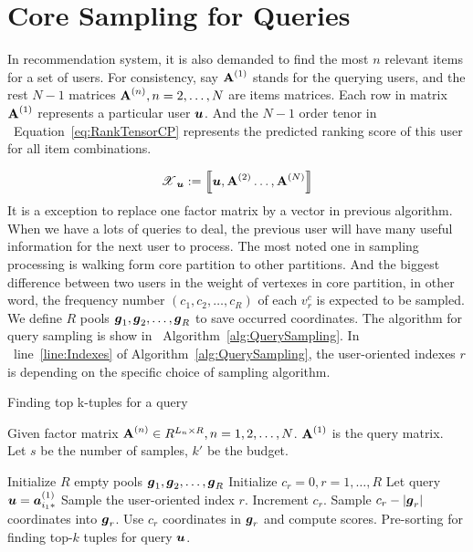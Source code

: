 \documentclass[letterpaper]{article}
\newcommand{\T}[1]{\boldsymbol{\mathscr{\MakeUppercase{#1}}}}
\newcommand{\KT}[1]{\left\llbracket #1 \right\rrbracket}
\newcommand{\V}[1]{{\bm{{\MakeLowercase{#1}}}}}
\newcommand{\VnC}[3]{\V{#1}^{(#2)}_{#3}}
\newcommand{\M}[1]{{\bm{\mathbf{\MakeUppercase{#1}}}}}
\newcommand{\Mn}[2]{\M{#1}^{(#2)}}
\newcommand{\Eqn}[1]   {Equation~\ref{eq:#1}}
\newcommand{\Alg}[1] {Algorithm~\ref{alg:#1}}
\newcommand{\AlgLine}[2]{line~\ref{line:#2} of Algorithm~\ref{alg:#1}}
\begin{document}
\section{Core Sampling for Queries}
In recommendation system,
it is also demanded to find the most $n$ relevant items for a set of users.
For consistency,
say $\M{A}^{(1)}$ stands for the querying users,
and the rest $N-1$ matrices $\M{A}^{(n)},n=2,\ldots,N$ are items matrices.
Each row in matrix $\M{A}^{(1)}$ represents a particular user $\V{u}$.
And the $N-1$ order tenor in ~\Eqn{RankTensorCP}
represents the predicted ranking score of this user for all item combinations.

\begin{equation}\label{eq:RankTensorCP}
\T{X}_{\V{u}} := \KT{ \V{u},\Mn{A}{2}\dots,\Mn{A}{N}}
\end{equation}
It is a exception to replace one factor matrix by a vector in previous algorithm.
When we have a lots of queries to deal,
the previous user will have many useful information for the next user to process.
The most noted one in sampling processing is walking form core partition to other partitions.
And the biggest difference between two users in the weight of vertexes in core partition,
in other word,
the frequency number $(c_1,c_2,\ldots,c_R)$ of each $v^c_r$ is expected to be sampled.
We define $R$ pools $\V{g}_1,\V{g}_2,\ldots,\V{g}_R$ to save occurred coordinates.
The algorithm for query sampling is show in ~\Alg{QuerySampling}.
In ~\AlgLine{QuerySampling}{Indexes},
the user-oriented indexes $r$ is depending on the specific choice of sampling algorithm.

\begin{algorithm}[t]
    \caption{Finding top k-tuples for a query}\label{alg:QuerySampling}
        Given factor matrix $\M{A}^{(n)}\in R^{L_n\times R}, n = 1,2,\ldots,N$.
        $\M{A}^{(1)}$ is the query matrix.\\
        Let $s$ be the number of samples, $k'$ be the budget.
    \begin{algorithmic}[1]
    \State Initialize $R$ empty pools $\V{g}_1,\V{g}_2,\ldots,\V{g}_R$
    \State Initialize $c_r = 0,r= 1,\ldots,R$
    \State Let query $\V{u}=\VnC{a}{1}{i_1*}$
    \State Sample the user-oriented index $r$.
    \label{line:Indexes}
    \State  Increment $c_r$.
    \EndFor
    \If {$c_r > |\V{g}_r|$ }
    \State Sample $c_r - |\V{g}_r|$ coordinates into $\V{g}_r$.
    \EndIf
    \State Use $c_r$ coordinates in $\V{g}_r$ and compute scores.
    \EndFor
    \State Pre-sorting for finding top-$k$ tuples for query $\V{u}$.
    \EndFor
    \end{algorithmic}
\end{algorithm}
\end{document}
